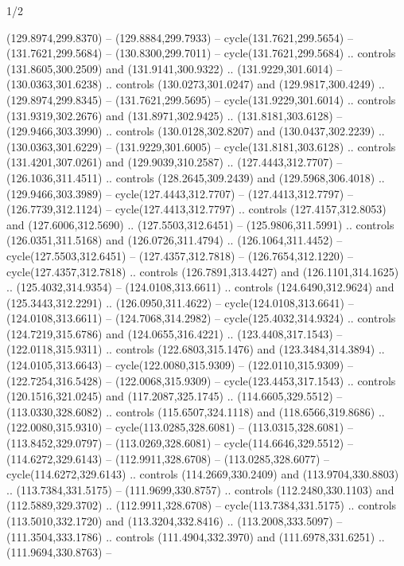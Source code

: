 \begin{flagdescription}{1/2}
\begin{scope}[shift={(0.26984,0.5)},scale=1/2.54]
\begin{scope}[scale=\flagwidth/550]
\begin{scope}
  (129.8974,299.8370) -- (129.8884,299.7933) -- cycle(131.7621,299.5654) --
  (131.7621,299.5684) -- (130.8300,299.7011) -- cycle(131.7621,299.5684) ..
  controls (131.8605,300.2509) and (131.9141,300.9322) .. (131.9229,301.6014) --
  (130.0363,301.6238) .. controls (130.0273,301.0247) and (129.9817,300.4249) ..
  (129.8974,299.8345) -- (131.7621,299.5695) -- cycle(131.9229,301.6014) ..
  controls (131.9319,302.2676) and (131.8971,302.9425) .. (131.8181,303.6128) --
  (129.9466,303.3990) .. controls (130.0128,302.8207) and (130.0437,302.2239) ..
  (130.0363,301.6229) -- (131.9229,301.6005) -- cycle(131.8181,303.6128) ..
  controls (131.4201,307.0261) and (129.9039,310.2587) .. (127.4443,312.7707) --
  (126.1036,311.4511) .. controls (128.2645,309.2439) and (129.5968,306.4018) ..
  (129.9466,303.3989) -- cycle(127.4443,312.7707) -- (127.4413,312.7797) --
  (126.7739,312.1124) -- cycle(127.4413,312.7797) .. controls
  (127.4157,312.8053) and (127.6006,312.5690) .. (127.5503,312.6451) --
  (125.9806,311.5991) .. controls (126.0351,311.5168) and (126.0726,311.4794) ..
  (126.1064,311.4452) -- cycle(127.5503,312.6451) -- (127.4357,312.7818) --
  (126.7654,312.1220) -- cycle(127.4357,312.7818) .. controls
  (126.7891,313.4427) and (126.1101,314.1625) .. (125.4032,314.9354) --
  (124.0108,313.6611) .. controls (124.6490,312.9624) and (125.3443,312.2291) ..
  (126.0950,311.4622) -- cycle(124.0108,313.6641) -- (124.0108,313.6611) --
  (124.7068,314.2982) -- cycle(125.4032,314.9324) .. controls
  (124.7219,315.6786) and (124.0655,316.4221) .. (123.4408,317.1543) --
  (122.0118,315.9311) .. controls (122.6803,315.1476) and (123.3484,314.3894) ..
  (124.0105,313.6643) -- cycle(122.0080,315.9309) -- (122.0110,315.9309) --
  (122.7254,316.5428) -- (122.0068,315.9309) -- cycle(123.4453,317.1543) ..
  controls (120.1516,321.0245) and (117.2087,325.1745) .. (114.6605,329.5512) --
  (113.0330,328.6082) .. controls (115.6507,324.1118) and (118.6566,319.8686) ..
  (122.0080,315.9310) -- cycle(113.0285,328.6081) -- (113.0315,328.6081) --
  (113.8452,329.0797) -- (113.0269,328.6081) -- cycle(114.6646,329.5512) --
  (114.6272,329.6143) -- (112.9911,328.6708) -- (113.0285,328.6077) --
  cycle(114.6272,329.6143) .. controls (114.2669,330.2409) and
  (113.9704,330.8803) .. (113.7384,331.5175) -- (111.9699,330.8757) .. controls
  (112.2480,330.1103) and (112.5889,329.3702) .. (112.9911,328.6708) --
  cycle(113.7384,331.5175) .. controls (113.5010,332.1720) and
  (113.3204,332.8416) .. (113.2008,333.5097) -- (111.3504,333.1786) .. controls
  (111.4904,332.3970) and (111.6978,331.6251) .. (111.9694,330.8763) --

\end{scope}
\end{scope}
\end{scope}
\end{flagdescription}
